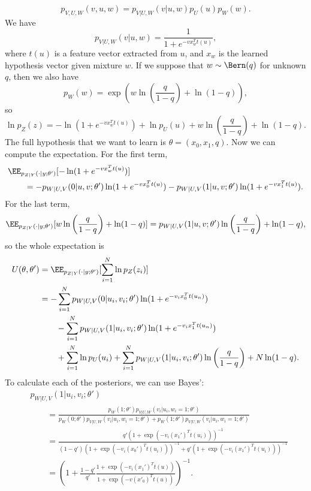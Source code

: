 \[p_{V,U,W}(v,u,w) = p_{V|U,W}(v|u,w)p_U(u)p_W(w).\] 
We have 
\[p_{V|U,W}(v|u,w) = \frac{1}{1 + e^{-vx_w^Tt(u)}},\] 
where $t(u)$ is a feature vector extracted from $u$, and $x_w$ is the learned hypothesis vector given mixture $w$. If we suppose that $w\sim \Bern(q)$ for unknown $q$, then we also have 
\[p_W(w) = \exp\left(w\ln \left(\frac{q}{1-q}\right) + \ln (1-q)\right),\] 
so
\[\ln p_Z(z) = -\ln(1+e^{-vx_w^Tt(u)}) + \ln p_U(u) + w\ln\left(\frac{q}{1-q}\right) + \ln (1-q).\] 
The full hypothesis that we want to learn is $\theta = (x_0, x_1, q)$. Now we can compute the expectation. For the first term,
\begin{align*}
	&\EE_{p_{Z|Y}(\cdot | y; \theta')}[-\ln (1 + e^{-vx_w^Tt(u)})] \\
	&\qquad = -p_{W|U,V}(0|u,v;\theta')\ln(1+e^{-vx_0^Tt(u)}) - p_{W|U,V}(1|u,v;\theta')\ln(1 + e^{-vx_1^Tt(u)}).
\end{align*}
For the last term,
\begin{align*}
	\EE_{p_{Z|Y}(\cdot | y; \theta')}[w\ln \left(\frac{q}{1-q}\right) + \ln (1-q)] = p_{W|U,V}(1|u,v;\theta')\ln\left(\frac{q}{1-q}\right) + \ln(1-q),
\end{align*}
so the whole expectation is
\begin{align*}
	U(\theta, \theta') &= \EE_{p_{Z|Y}(\cdot | y; \theta')}[\sum_{i=1}^N\ln p_Z(z_i)] \\
										 &= -\sum_{i=1}^N p_{W|U,V}(0|u_i,v_i;\theta')\ln(1 + e^{-v_ix_0^Tt(u_n)}) \\
										 &\qquad -\sum_{i=1}^N p_{W|U,V}(1|u_i,v_i;\theta')\ln(1 + e^{-v_ix_1^Tt(u_n)}) \\
										 &\qquad + \sum_{i=1}^N\ln p_U(u_i) + \sum_{i=1}^N p_{W|U,V}(1|u_i,v_i;\theta')\ln \left(\frac{q}{1-q}\right) + N \ln(1-q).
\end{align*}
To calculate each of the posteriors, we can use Bayes': 
\begin{align*}
	&p_{W|U,V}(1|u_i,v_i;\theta')\\
	&\qquad = \frac{p_{W}(1;\theta')p_{V|U,W}(v_i|u_i,w_i=1;\theta')}{p_{W}(0;\theta')p_{V|U,W}(v_i|u_i,w_i=1;\theta') + p_W(1;\theta')p_{V|U,W}(v_i|u_i,w_i=1;\theta')} \\
	&\qquad= \frac{q'(1 + \exp(-v_i(x_1')^Tt(u_i)))^{-1}}{(1-q')(1 + \exp(-v_i(x_0')^Tt(u_i)))^{-1} + q'(1 + \exp(-v_i(x_1')^Tt(u_i)))^{-1}} \\
	&\qquad= \left(1 + \frac{1-q'}{q'}\frac{1 + \exp(-v_i(x_1')^Tt(u))}{1 + \exp(-v(x'_0)^Tt(u))}\right)^{-1}.
\end{align*}

